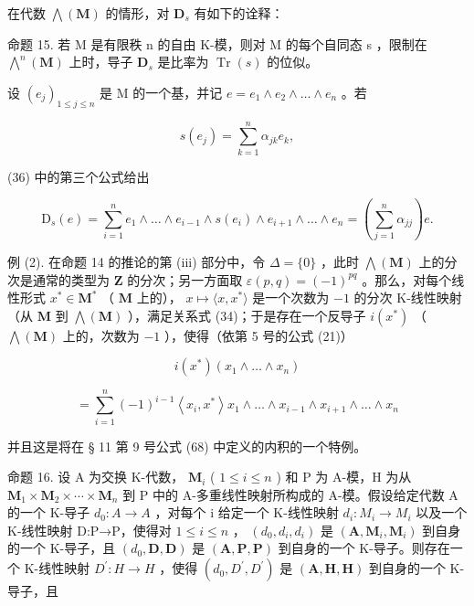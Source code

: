 在代数 \(\bigwedge (\mathbf{M})\) 的情形，对 \(\mathbf{D}_s\) 有如下的诠释：

命题 15. 若 M 是有限秩 n 的自由 K-模，则对 M 的每个自同态 s ，限制在 \(\bigwedge^{n}(\mathbf{M})\) 上时，导子 \(\mathbf{D}_{s}\) 是比率为 \(\operatorname{Tr}(s)\) 的位似。

设 \((e_j)_{1\leqslant j\leqslant n}\) 是 M 的一个基，并记 \(e = e_1\wedge e_2\wedge \dots \wedge e_n\) 。若

\[
s (e _ {j}) = \sum_ {k = 1} ^ {n} \alpha_ {j k} e _ {k},
\]

(36) 中的第三个公式给出

\[
\mathrm{D} _ {s} (e) = \sum_ {i = 1} ^ {n} e _ {1} \wedge \dots \wedge e _ {i - 1} \wedge s \left(e _ {i}\right) \wedge e _ {i + 1} \wedge \dots \wedge e _ {n} = \left(\sum_ {j = 1} ^ {n} \alpha_ {j j}\right) e.
\]

例 (2). 在命题 14 的推论的第 (iii) 部分中，令 \(\Delta = \{0\}\) ，此时 \(\bigwedge (\mathbf{M})\) 上的分次是通常的类型为 \(\mathbf{Z}\) 的分次；另一方面取 \(\varepsilon(p, q) = (-1)^{pq}\) 。那么，对每个线性形式 \(x^{*} \in \mathbf{M}^{*}\) （ \(\mathbf{M}\) 上的）， \(x \mapsto \langle x, x^{*} \rangle\) 是一个次数为 \(-1\) 的分次 K-线性映射（从 \(\mathbf{M}\) 到 \(\bigwedge (\mathbf{M})\) ），满足关系式 (34)；于是存在一个反导子 \(i(x^{*})\) （ \(\bigwedge (\mathbf{M})\) 上的，次数为 \(-1\) ），使得（依第 5 号的公式 (21)）

\[
i \left(x ^ {*}\right) \left(x _ {1} \wedge \dots \wedge x _ {n}\right)
\]

\[
= \sum_ {i = 1} ^ {n} (- 1) ^ {i - 1} \left\langle x _ {i}, x ^ {*} \right\rangle x _ {1} \wedge \dots \wedge x _ {i - 1} \wedge x _ {i + 1} \wedge \dots \wedge x _ {n}
\]

并且这是将在 § 11 第 9 号公式 (68) 中定义的内积的一个特例。

命题 16. 设 A 为交换 K-代数， \(\mathbf{M}_i\) ( \(1 \leqslant i \leqslant n\) ) 和 P 为 A-模，H 为从 \(\mathbf{M}_1 \times \mathbf{M}_2 \times \cdots \times \mathbf{M}_n\) 到 P 中的 A-多重线性映射所构成的 A-模。假设给定代数 A 的一个 K-导子 \(d_{0}:A\to A\) ，对每个 i 给定一个 K-线性映射 \(d_{i}:M_{i}\to M_{i}\) 以及一个 K-线性映射 D:P→P，使得对 \(1\leqslant i\leqslant n\) ， \((d_{0},d_{i},d_{i})\) 是 \((\mathbf{A},\mathbf{M}_{i},\mathbf{M}_{i})\) 到自身的一个 K-导子，且 \((d_{0},\mathbf{D},\mathbf{D})\) 是 \((\mathbf{A},\mathbf{P},\mathbf{P})\) 到自身的一个 K-导子。则存在一个 K-线性映射 \(D^{\prime}:H\to H\) ，使得 \((d_{0},D^{\prime},D^{\prime})\) 是 \((\mathbf{A},\mathbf{H},\mathbf{H})\) 到自身的一个 K-导子，且

